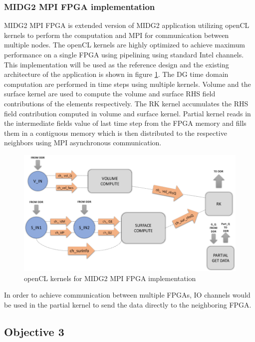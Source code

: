 \documentclass[english,notitlepage]{hgbreport}
\begin{document}
\subsubsection{MIDG2 MPI FPGA implementation}
MIDG2 MPI FPGA is extended version of MIDG2 application utilizing openCL kernels to perform the
computation and MPI for communication between multiple nodes. The openCL kernels are
highly optimized to achieve maximum performance on a single FPGA using pipelining using
standard Intel channels. This implementation will be used as the reference design and
the existing architecture of the application is shown in figure \ref{fig:kernels}.
The DG time domain computation are performed in time steps using multiple kernels.
Volume and the surface kernel are used to compute the volume and surface RHS field
contributions of the elements respectively. The RK kernel accumulates the RHS
field contribution computed in volume and surface kernel. Partial kernel reads in
the intermediate fields value of last time step from the FPGA memory and fills them
in a contiguous memory which is then distributed to the respective neighbors using
MPI asynchronous communication.

\begin{figure}[h]%
    \centering
    \includegraphics[width=1.0\textwidth]{images/kernels}
    \caption{openCL kernels for MIDG2 MPI FPGA implementation}
    \label{fig:kernels}
\end{figure}

In order to achieve communication between multiple FPGAs, IO channels would be used
in the partial kernel to send the data directly to the neighboring FPGA.

\subsection{Objective 3}
\end{document}
